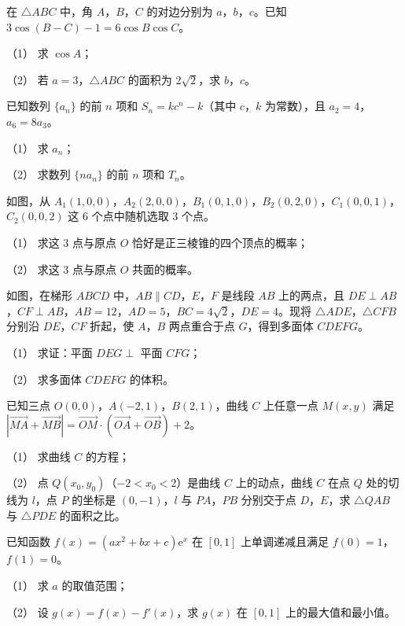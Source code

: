 \begin{question}
在 $\triangle ABC$ 中，角 $A$，$B$，$C$ 的对边分别为 $a$，$b$，$c$。已知 $3\cos(B-C)-1=6\cos B\cos C$。

（1） 求 $\cos A$；

（2） 若 $a=3$，$\triangle ABC$ 的面积为 $2\sqrt2$，求 $b$，$c$。

\end{question}
\begin{question}
已知数列 $\{a_n\}$ 的前 $n$ 项和 $S_n=kc^n-k$（其中 $c$，$k$ 为常数），且 $a_2=4$，$a_6=8a_3$。

（1） 求 $a_n$；

（2） 求数列 $\{na_n\}$ 的前 $n$ 项和 $T_n$。

\Needspace{0.4\textheight}
\end{question}
\begin{question}
如图，从 $A_1(1,0,0)$，$A_2(2,0,0)$，$B_1(0,1,0)$，$B_2(0,2,0)$，$C_1(0,0,1)$，$C_2(0,0,2)$ 这 $6$ 个点中随机选取 $3$ 个点。

（1） 求这 $3$ 点与原点 $O$ 恰好是正三棱锥的四个顶点的概率；

（2） 求这 $3$ 点与原点 $O$ 共面的概率。
\nopagebreak[4]
\begin{center}\end{center}
\nopagebreak[4]
\Needspace{0.4\textheight}
\end{question}
\begin{question}
如图，在梯形 $ABCD$ 中，$AB\parallel CD$，$E$，$F$ 是线段 $AB$ 上的两点，且 $DE\perp AB$，$CF\perp AB$，$AB=12$，$AD=5$，$BC=4\sqrt2$，$DE=4$。现将 $\triangle ADE$，$\triangle CFB$ 分别沿 $DE$，$CF$ 折起，使 $A$，$B$ 两点重合于点 $G$，得到多面体 $CDEFG$。

（1） 求证：平面 $DEG\perp$ 平面 $CFG$；

（2） 求多面体 $CDEFG$ 的体积。
\nopagebreak[4]
\begin{center}\end{center}
\nopagebreak[4]
\end{question}
\begin{question}
已知三点 $O(0,0)$，$A(-2,1)$，$B(2,1)$，曲线 $C$ 上任意一点 $M(x,y)$ 满足 $\left|\overrightarrow{MA}+\overrightarrow{MB}\right|=\overrightarrow{OM}\cdot\left(\overrightarrow{OA}+\overrightarrow{OB}\right)+2$。

（1） 求曲线 $C$ 的方程；

（2） 点 $Q(x_0,y_0)$（$-2<x_0<2$）是曲线 $C$ 上的动点，曲线 $C$ 在点 $Q$ 处的切线为 $l$，点 $P$ 的坐标是 $(0,-1)$，$l$ 与 $PA$，$PB$ 分别交于点 $D$，$E$，求 $\triangle QAB$ 与 $\triangle PDE$ 的面积之比。

\end{question}
\begin{question}
已知函数 $f(x)=(ax^2+bx+c)\mathrm e^x$ 在 $[0,1]$ 上单调递减且满足 $f(0)=1$，$f(1)=0$。

（1） 求 $a$ 的取值范围；

（2） 设 $g(x)=f(x)-f'(x)$，求 $g(x)$ 在 $[0,1]$ 上的最大值和最小值。

\end{question}